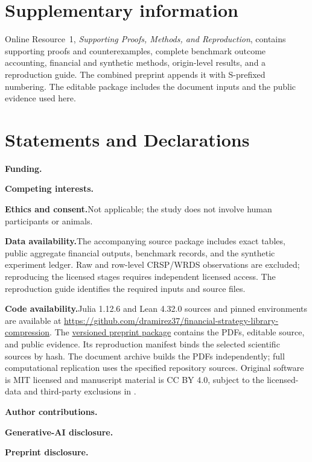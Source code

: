 \documentclass[pdflatex,sn-mathphys-ay]{sn-jnl}
\numberwithin{equation}{section}
\theoremstyle{definition}
\theoremstyle{plain}
\newcommand{\DeclarationHead}[1]{%
  \par\medskip\noindent\textbf{#1.}\enspace}
\begin{document}
\section*{Supplementary information}
Online Resource~1, \emph{Supporting Proofs, Methods, and Reproduction}, contains
supporting proofs and counterexamples, complete benchmark outcome accounting,
financial and synthetic methods, origin-level results, and a reproduction
guide. The combined preprint appends it with S-prefixed numbering. The
editable package includes the document inputs and the public evidence used here.

\section*{Statements and Declarations}
\DeclarationHead{Funding}\AORFundingStatement
\DeclarationHead{Competing interests}\AORCompetingInterestsStatement
\DeclarationHead{Ethics and consent}Not applicable; the study does not involve human participants or animals.
\DeclarationHead{Data availability}The accompanying source package includes
exact tables, public aggregate financial outputs, benchmark records, and the
synthetic experiment ledger. Raw and row-level CRSP/WRDS observations are
excluded; reproducing the licensed stages requires independent licensed access.
The reproduction guide identifies the required inputs and source files.
\DeclarationHead{Code availability}Julia 1.12.6 and Lean 4.32.0 sources and pinned
environments are available at
\url{https://github.com/dramirez37/financial-strategy-library-compression}.
The \href{https://github.com/dramirez37/financial-strategy-library-compression/tree/v0.3.1-ssrn/release/v0.3.1-ssrn}{versioned preprint package}
contains the PDFs, editable source, and public evidence. Its reproduction manifest binds the selected scientific sources
by hash. The document archive builds the PDFs independently; full computational
replication uses the specified repository sources. Original software is MIT
licensed and manuscript material is CC BY 4.0, subject to the licensed-data and
third-party exclusions in .
\DeclarationHead{Author contributions}\AORAuthorContributionStatement
\DeclarationHead{Generative-AI disclosure}\AORGenerativeAIDisclosureStatement
\DeclarationHead{Preprint disclosure}\AORPreprintDisclosureStatement

\end{document}
